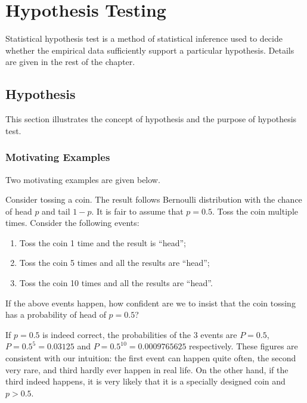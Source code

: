 \chapter{Hypothesis Testing} \label{ch:ht}

Statistical hypothesis test is a method of statistical inference used to decide whether the empirical data sufficiently support a particular hypothesis. Details are given in the rest of the chapter.

\section{Hypothesis}

This section illustrates the concept of hypothesis and the purpose of hypothesis test.

\subsection{Motivating Examples}

Two motivating examples are given below.

\begin{shortbox}

Consider tossing a coin. The result follows Bernoulli distribution with the chance of head $p$ and tail $1-p$. It is fair to assume that $p=0.5$. Toss the coin multiple times. Consider the following events:
\begin{enumerate}
	\item Toss the coin 1 time and the result is ``head'';
	\item Toss the coin 5 times and all the results are ``head'';
	\item Toss the coin 10 times and all the results are ``head''.
\end{enumerate}

If the above events happen, how confident are we to insist that the coin tossing has a probability of head of $p=0.5$?

\end{shortbox}

If $p=0.5$ is indeed correct, the probabilities of the 3 events are $P=0.5$, $P=0.5^5=0.03125$ and $P=0.5^{10}= 0.0009765625$ respectively. These figures are consistent with our intuition: the first event can happen quite often, the second very rare, and third hardly ever happen in real life. On the other hand, if the third indeed happens, it is very likely that it is a specially designed coin and $p>0.5$.

